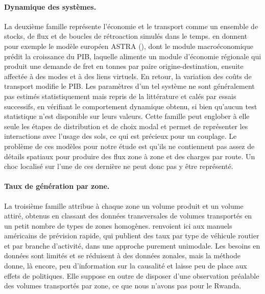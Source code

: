 \documentclass[12pt,a4paper,french]{report}
\begin{document}
	\paragraph{Dynamique des systèmes.} La deuxième famille représente l'économie et le transport comme un ensemble de stocks, de flux et de boucles de rétroaction simulés dans le temps. \cite{deJong2004} en donnent pour exemple le modèle européen ASTRA (\cite{ASTRA2000}), dont le module macroéconomique prédit la croissance du PIB, laquelle alimente un module d'économie régionale qui produit une demande de fret en tonnes par paire origine-destination, ensuite affectée à des modes et à des liens virtuels. En retour, la variation des coûts de transport modifie le PIB. Les paramètres d'un tel système ne sont généralement pas estimés statistiquement mais repris de la littérature et calés par essais successifs, en vérifiant le comportement dynamique obtenu, si bien qu'aucun test statistique n'est disponible sur leurs valeurs. Cette famille peut englober à elle seule les étapes de distribution et de choix modal et permet de représenter les interactions avec l'usage des sols, ce qui est précieux pour un couplage. Le problème de ces modèles pour notre étude est qu'ils ne contiennent pas assez de détails spatiaux pour produire des flux zone à zone et des charges par route. Un choc localisé sur l'une de ces dernière ne peut donc pas y être représenté.

	\paragraph{Taux de génération par zone.} La troisième famille attribue à chaque zone un volume produit et un volume attiré, obtenus en classant des données transversales de volumes transportés en un petit nombre de types de zones homogènes. \cite{deJong2004} renvoient ici aux manuels américains de prévision rapide, qui publient des taux par type de véhicule routier et par branche d'activité, dans une approche purement unimodale. Les besoins en données sont limités et se réduisent à des données zonales, mais la méthode donne, là encore, peu d'information sur la causalité et laisse peu de place aux effets de politiques. Elle suppose en outre de disposer d'une observation préalable des volumes transportés par zone, ce que nous n'avons pas pour le Rwanda.
\end{document}
